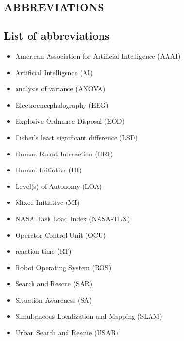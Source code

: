\documentclass[a4paper,12pt,oneside,openright]{bhamthesis}
\begin{document}
\begin{appendices}
\chapter{ABBREVIATIONS}

\section{List of abbreviations}
\begin{itemize}
	\item American Association for Artificial Intelligence (AAAI)
	\item Artificial Intelligence (AI) 
	\item analysis of variance (ANOVA)
	\item Electroencephalography (EEG)
    \item Explosive Ordnance Disposal (EOD)
    \item Fisher's least significant difference (LSD)
	\item Human-Robot Interaction (HRI)
    \item Human-Initiative (HI)
	\item Level(s) of Autonomy (LOA)
    \item Mixed-Initiative (MI)
	\item NASA Task Load Index (NASA-TLX) 
    \item Operator Control Unit (OCU) 
    \item reaction time (RT)
    \item Robot Operating System (ROS)  
    \item Search and Rescue (SAR)
	\item Situation Awareness (SA)
	\item Simultaneous Localization and Mapping (SLAM) 
    \item Urban Search and Rescue (USAR)
\end{itemize}	


\end{appendices}
\end{document}
